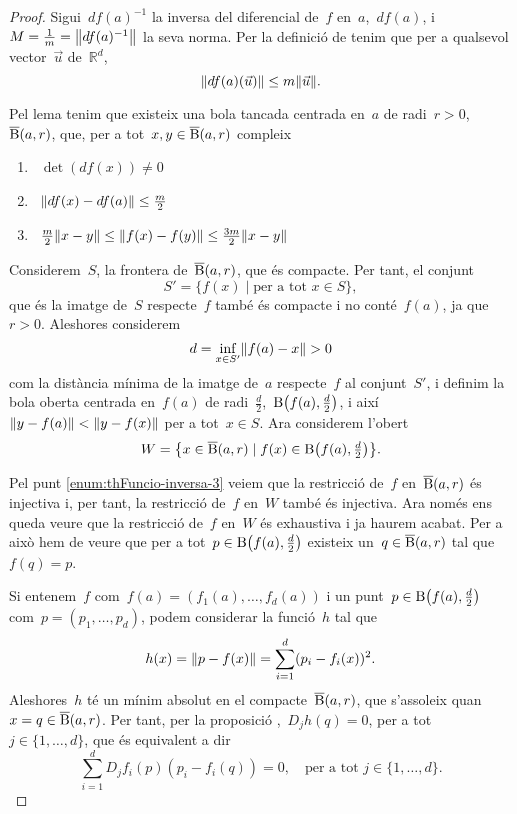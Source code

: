 \documentclass[../../main.tex]{subfiles}
\begin{document}
    \begin{proof}
        Sigui~\(df(a)^{-1}\) la inversa del diferencial de~\(f\) en~\(a\),~\(df(a)\), i~\(M=\frac{1}{m}=\norm{df(a)^{-1}}\) la seva norma.
        Per la definició de  tenim que per a qualsevol vector~\(\vec{u}\) de~\(\mathbb{R}^{d}\),
        \[
            \norm{df(a)(\vec{u})}\leq m\norm{\vec{u}}.
        \]

        Pel lema  tenim que existeix una bola tancada centrada en~\(a\) de radi~\(r>0\),~\(\overline{\operatorname{B}}(a,r)\), que, per a tot~\(x,y\in\overline{\operatorname{B}}(a,r)\) compleix
        \begin{enumerate}
            \item\label{enum:thFuncio-inversa-1}~\(\det(df(x))\neq0\)
            \item\label{enum:thFuncio-inversa-2}~\(\norm{df(x)-df(a)}\leq\frac{m}{2}\)
            \item\label{enum:thFuncio-inversa-3}~\(\frac{m}{2}\norm{x-y} \leq\norm{f(x)-f(y)}\leq\frac{3m}{2}\norm{x-y}\)
        \end{enumerate}

        Considerem~\(S\), la frontera de~\(\overline{\operatorname{B}}(a,r)\), que és compacte.
        Per tant, el conjunt
        \[
            S'=\{f(x)\mid\text{per a tot }x\in S\},
        \]
        que és la imatge de~\(S\) respecte~\(f\) també és compacte i no conté~\(f(a)\), ja que~\(r>0\).
        Aleshores considerem
        \[
            d=\inf_{x\in S'}\norm{f(a)-x}>0
        \]
        com la distància mínima de la imatge de~\(a\) respecte~\(f\) al conjunt~\(S'\), i definim la bola oberta centrada en~\(f(a)\) de radi~\(\frac{d}{2}\),~\(\B\left(f(a),\tfrac{d}{2}\right)\), i així~\(\norm{y-f(a)}<\norm{y-f(x)}\) per a tot~\(x\in S\).
        Ara considerem l'obert
        \[
            W=\left\{x\in\overline{\B}(a,r)\mid f(x)\in\B\left(f(a),\tfrac{d}{2}\right)\right\}.
        \]

        Pel punt \eqref{enum:thFuncio-inversa-3} veiem que la restricció de~\(f\) en~\(\overline{\operatorname{B}}(a,r)\) és injectiva i, per tant, la restricció de~\(f\) en~\(W\) també és injectiva.
        Ara només ens queda veure que la restricció de~\(f\) en~\(W\) és exhaustiva i ja haurem acabat.
        Per a això hem de veure que per a tot~\(p\in\B\left(f(a),\tfrac{d}{2}\right)\) existeix un~\(q\in\overline{\operatorname{B}}(a,r)\) tal que~\(f(q)=p\).

        Si entenem~\(f\) com~\(f(a)=(f_{1}(a),\dots,f_{d}(a))\) i un punt~\(p\in\B\left(f(a),\tfrac{d}{2}\right)\) com~\(p=(p_{1},\dots,p_{d})\), podem considerar la funció~\(h\) tal que
        \[
            h(x)=\norm{p-f(x)}=\sum_{i=1}^{d}(p_{i}-f_{i}(x))^{2}.
        \]
        Aleshores~\(h\) té un mínim absolut en el compacte~\(\overline{\operatorname{B}}(a,r)\), que s'assoleix quan~\(x=q\in\overline{\operatorname{B}}(a,r)\).
        Per tant, per la proposició ,~\(D_{j}h(q)=0\), per a tot~\(j\in\{1,\dots,d\}\), que és equivalent a dir
        \[
            \sum_{i=1}^{d}D_{j}f_{i}(p)(p_{i}-f_{i}(q))=0,\quad\text{per a tot }j\in\{1,\dots,d\}.
        \]


\end{proof}
\end{document}
